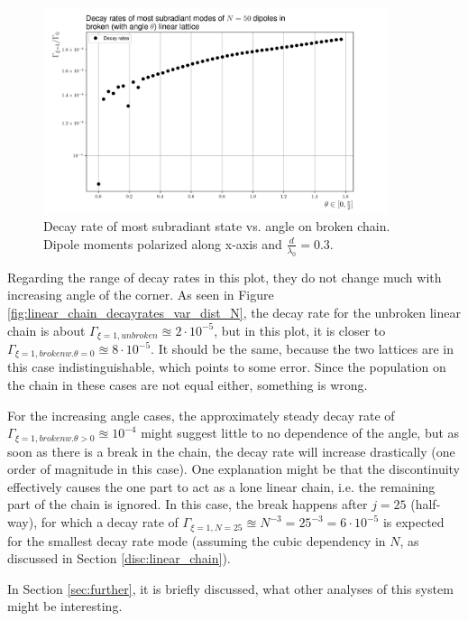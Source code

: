 \documentclass{article}
\begin{document}
\begin{figure}[H]
    \includegraphics[width=0.9\textwidth]{figs/case_linear_broken_rates.png}
    \caption{Decay rate of most subradiant state vs. angle on broken chain. Dipole moments polarized along x-axis and $\frac{d}{\lambda_0} = 0.3$. }
    \label{fig:linear_broken_rates}
\end{figure}
Regarding the range of decay rates in this plot, they do not change much with increasing angle of the corner. As seen in Figure \ref{fig:linear_chain_decayrates_var_dist_N}, the decay rate for the unbroken linear chain is about $\Gamma_{\xi=1, unbroken} \approxeq 2 \cdot 10^{-5}$, but in this plot, it is closer to $\Gamma_{\xi=1, broken w. \theta = 0} \approxeq 8 \cdot 10^{-5}$. It should be the same, because the two lattices are in this case indistinguishable, which points to some error. Since the population on the chain in these cases are not equal either, something is wrong. 

For the increasing angle cases, the approximately steady decay rate of $\Gamma_{\xi = 1, broken w. \theta > 0} \approxeq 10^{-4}$ might suggest little to no dependence of the angle, but as soon as there is a break in the chain, the decay rate will increase drastically (one order of magnitude in this case). One explanation might be that the discontinuity effectively causes the one part to act as a lone linear chain, i.e. the remaining part of the chain is ignored. In this case, the break happens after $j=25$ (half-way), for which a decay rate of $\Gamma_{\xi=1, N=25} \approxeq N^{-3} = 25^{-3} = 6 \cdot 10^{-5}$ is expected for the smallest decay rate mode (assuming the cubic dependency in $N$, as discussed in Section \ref{disc:linear_chain}). 

In Section \ref{sec:further}, it is briefly discussed, what other analyses of this system might be interesting. 
\end{document}
